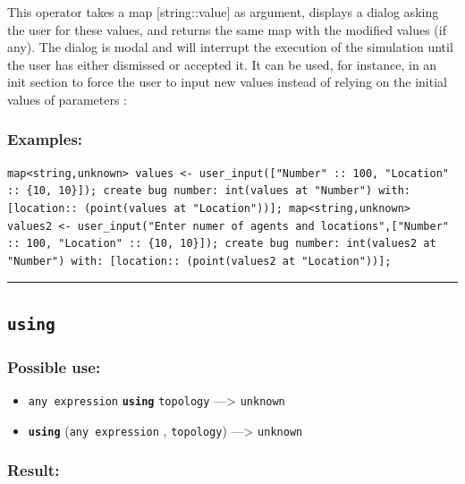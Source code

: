 \documentclass[]{book}
\providecommand{\tightlist}{%
  \setlength{\itemsep}{0pt}\setlength{\parskip}{0pt}}
\theoremstyle{definition}
\theoremstyle{definition}
\theoremstyle{definition}
\theoremstyle{remark}
\begin{document}
This operator takes a map {[}string::value{]} as argument, displays a
dialog asking the user for these values, and returns the same map with
the modified values (if any). The dialog is modal and will interrupt the
execution of the simulation until the user has either dismissed or
accepted it. It can be used, for instance, in an init section to force
the user to input new values instead of relying on the initial values of
parameters :

\subsubsection{Examples:}\label{examples-376}

\begin{verbatim}
map<string,unknown> values <- user_input(["Number" :: 100, "Location" :: {10, 10}]); create bug number: int(values at "Number") with: [location:: (point(values at "Location"))]; map<string,unknown> values2 <- user_input("Enter numer of agents and locations",["Number" :: 100, "Location" :: {10, 10}]); create bug number: int(values2 at "Number") with: [location:: (point(values2 at "Location"))]; 
\end{verbatim}

\begin{center}\rule{0.5\linewidth}{\linethickness}\end{center}

\subsection{\texorpdfstring{\texttt{using}}{using}}\label{using}

\subsubsection{Possible use:}\label{possible-use-547}

\begin{itemize}
\tightlist
\item
  \texttt{any\ expression} \textbf{\texttt{using}} \texttt{topology}
  ---\textgreater{} \texttt{unknown}
\item
  \textbf{\texttt{using}} (\texttt{any\ expression} , \texttt{topology})
  ---\textgreater{} \texttt{unknown}
\end{itemize}

\subsubsection{Result:}\label{result-527}
\end{document}
